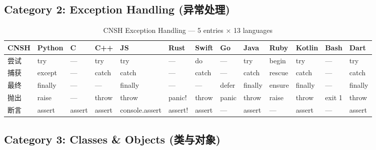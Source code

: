 \subsection{Category 2: Exception Handling (异常处理)}
\label{app:ren-exception}

\begin{table}[h]
\centering
\caption{CNSH Exception Handling — 5 entries × 13 languages}
\renewcommand{\arraystretch}{1.2}
\fontsize{8}{10}\selectfont
\begin{tabular}{lllllllllllll}
\toprule
\textbf{CNSH} & \textbf{Python} & \textbf{C} & \textbf{C++} & \textbf{JS} & \textbf{Rust} & \textbf{Swift} & \textbf{Go} & \textbf{Java} & \textbf{Ruby} & \textbf{Kotlin} & \textbf{Bash} & \textbf{Dart} \\
\midrule
尝试 & try & — & try & try & — & do & — & try & begin & try & — & try \\
捕获 & except & — & catch & catch & — & catch & — & catch & rescue & catch & — & catch \\
最终 & finally & — & — & finally & — & — & defer & finally & ensure & finally & — & finally \\
抛出 & raise & — & throw & throw & panic! & throw & panic & throw & raise & throw & exit 1 & throw \\
断言 & assert & assert & assert & console.assert & assert! & assert & — & assert & — & assert & — & assert \\
\bottomrule
\end{tabular}
\end{table}

\subsection{Category 3: Classes \& Objects (类与对象)}
\label{app:ren-classes}

